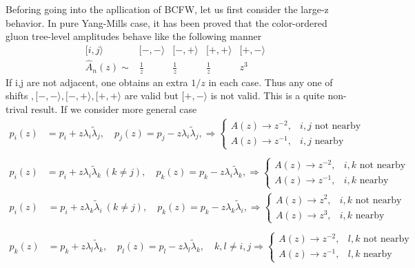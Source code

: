 \documentclass[12pt]{article}
\numberwithin{equation}{section}
\begin{document}
Beforing going into the apllication of BCFW, let us first consider the large-z behavior. 
In pure Yang-Mills case, it has been proved that the color-ordered gluon tree-level amplitudes behave like the following manner\cite{Arkani-Hamed:2001kyx}
$$ 
\begin{array}{cccccc}
   [i,j\rangle & [-,-\rangle & [-,+\rangle & [+,+\rangle & [+,-\rangle &
   \\[2mm]
   \hat{A}_n(z) \sim 
   &  \frac{1}{z} &  \frac{1}{z} &  \frac{1}{z} & z^3
   \end{array}
$$
If i,j are not adjacent, one obtains an extra $1/z$ in each case. Thus any one of shifts $,[-,-\rangle,[-,+\rangle,[+,+\rangle$ are valid
but $[+,-\rangle$ is not valid. This is a quite non-trival result.
If we consider more general case\cite{Feng:2011np}
\begin{equation*}
\begin{aligned}
p_i(z) &= p_i + z \lambda_i \tilde{\lambda}_j, \quad
p_j(z) = p_j - z \lambda_i \tilde{\lambda}_j, 
\Rightarrow
\begin{cases}
A(z) \to z^{-2}, & i, j \text{ not nearby} \\
A(z) \to z^{-1}, & i, j \text{ nearby}
\end{cases} \\
\\
p_i(z) &= p_i + z \lambda_i \tilde{\lambda}_k \ (k \neq j), \quad
p_k(z) = p_k - z \lambda_i \tilde{\lambda}_k,
\Rightarrow
\begin{cases}
A(z) \to z^{-2}, & i, k \text{ not nearby} \\
A(z) \to z^{-1}, & i, k \text{ nearby}
\end{cases}
\end{aligned}
\end{equation*}
\begin{equation}
\begin{aligned}
p_i(z) &= p_i + z \lambda_k \tilde{\lambda}_i \ (k \neq j), \quad
p_k(z) = p_k - z \lambda_k \tilde{\lambda}_i,
\Rightarrow
\begin{cases}
A(z) \to z^2, & i, k \text{ not nearby} \\
A(z) \to z^3, & i, k \text{ nearby}
\end{cases} \\
\\
p_k(z) &= p_k + z \lambda_l \tilde{\lambda}_k, \quad
p_l(z) = p_l - z \lambda_l \tilde{\lambda}_k, \quad
k, l \neq i,j
\Rightarrow
\begin{cases}
A(z) \to z^{-2}, & l, k \text{ not nearby} \\
A(z) \to z^{-1}, & l, k \text{ nearby}
\end{cases}
\end{aligned}
\end{equation}
\end{document}

